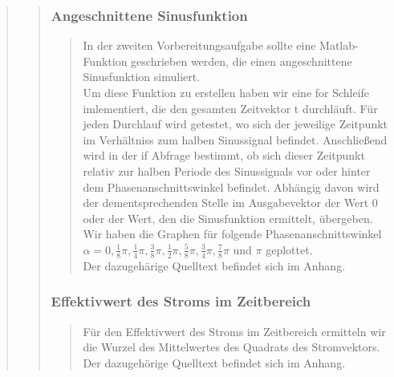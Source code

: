 \begin{quote}
\begin{quote}
\begin{quote}
        \end{quote}
        
    	\subsubsection{Angeschnittene Sinusfunktion}
        \begin{quote}
            In der zweiten Vorbereitungsaufgabe sollte eine Matlab-Funktion
            geschrieben werden, die einen angeschnittene Sinusfunktion simuliert.\\
            Um diese Funktion zu erstellen haben wir eine for Schleife
            imlementiert, die den gesamten Zeitvektor t durchläuft. Für jeden Durchlauf wird getestet, 
            wo sich der jeweilige Zeitpunkt im Verhältniss zum halben
            Sinussignal befindet. Anschließend wird in der if Abfrage bestimmt, ob sich dieser Zeitpunkt relativ zur halben
            Periode des Sinussignals vor oder hinter dem Phasenanschnittswinkel befindet. Abhängig davon wird der
            dementsprechenden Stelle im Ausgabevektor der Wert $0$ oder der
            Wert, den die Sinusfunktion ermittelt, übergeben.\\
            Wir haben die Graphen für folgende Phasenanschnittswinkel $ \alpha = 0, \frac{1}{8} \pi, \frac{1}{4}
            \pi, \frac{3}{8} \pi, \frac{1}{2} \pi,\frac{5}{8} \pi, \frac{3}{4} \pi, \frac{7}{8} \pi$ und $\pi$
            geplottet.\\
            Der dazugehärige Quelltext befindet sich im Anhang.
        \end{quote}
        
        \subsubsection{Effektivwert des Stroms im Zeitbereich}
        \begin{quote}
            Für den Effektivwert des Stroms im Zeitbereich ermitteln wir die Wurzel des Mittelwertes des Quadrats des
            Stromvektors.\\
            Der dazugehörige Quelltext befindet sich im Anhang.
        \end{quote}
        

\end{quote}
\end{quote}
